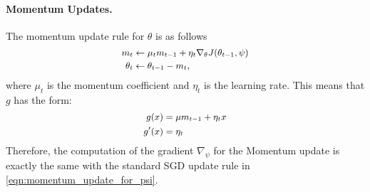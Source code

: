 
\paragraph{Momentum Updates.} The momentum update rule for $\theta$ is as follows
\begin{equation}
  \label{eqn:momentum_update}
   \small
  \begin{aligned}
    m_t &\leftarrow \mu_t m_{t-1} + \eta_t \nabla_\theta J(\theta_{t-1}, \psi) \\
    \theta_t &\leftarrow \theta_{t-1} - m_t,
  \end{aligned}
\end{equation}
where $\mu_t$ is the momentum coefficient and $\eta_t$ is the learning rate. This means that $g$ has the form:
\begin{equation}
  \label{eqn:momentum_update_g}
   \small
  \begin{aligned}
    g(x) &= \mu m_{t-1} + \eta_t x \\
    g'(x) &= \eta_t
  \end{aligned}
\end{equation}
Therefore, the computation of the gradient $\nabla_{\psi}$ for the Momentum update is exactly the same with the standard SGD update rule in \autoref{eqn:momentum_update_for_psi}.


